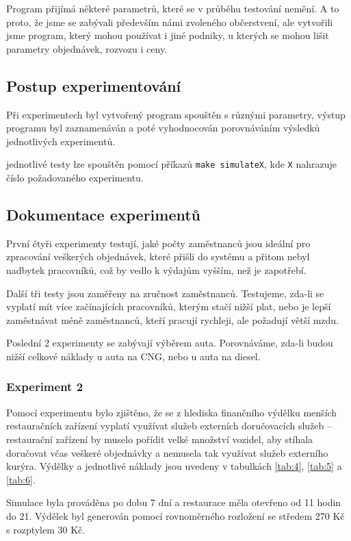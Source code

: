 \documentclass[a4paper, 11pt]{article}
\begin{document}
Program přijímá některé parametrů, které se v průběhu testování nemění. A to proto, že jsme se zabývali především námi zvoleného občerstvení, ale vytvořili jsme program, který mohou používat i jiné podniky, u kterých se mohou lišit parametry objednávek, rozvozu i ceny.

\subsection{Postup experimentování}
Při experimentech byl vytvořený program spouštěn s různými parametry, výstup programu byl zaznamenáván a poté vyhodnocován porovnáváním výsledků jednotlivých experimentů.


jednotlivé testy lze spouštěn pomocí příkazů \texttt{make simulateX}, kde \texttt{X} nahrazuje číslo požadovaného experimentu.

\subsection{Dokumentace experimentů}
První čtyři experimenty testují, jaké počty zaměstnanců jsou ideální pro zpracování veškerých objednávek, které přišli do systému a přitom nebyl nadbytek pracovníků, což by vedlo k výdajům vyšším, než je zapotřebí.

Další tři testy jsou zaměřeny na zručnost zaměstnanců. Testujeme, zda-li se vyplatí mít více začínajících pracovníků, kterým stačí nižší plat, nebo je lepší zaměstnávat méně zaměstnanců, kteří pracují rychleji, ale požadují větší mzdu.

Poslední 2 experimenty se zabývají výběrem auta. Porovnáváme, zda-li budou nižší celkové náklady u auta na CNG, nebo u auta na diesel. 

\subsubsection{Experiment 2}
Pomocí experimentu bylo zjištěno, že se z hlediska finančního výdělku menších restauračních zařízení vyplatí využívat služeb externích doručovacích služeb -- restaurační zařízení by muselo pořídit velké množství vozidel, aby stíhala doručovat včas veškeré objednávky a nemusela tak využívat služeb externího kurýra. Výdělky a jednotlivé náklady jsou uvedeny v tabulkách \ref{tab:4}, \ref{tab:5} a \ref{tab:6}. 

Simulace byla prováděna po dobu 7 dní a restaurace měla otevřeno od 11 hodin do 21. Výdělek byl generován pomocí rovnoměrného rozložení se středem 270 Kč s rozptylem 30 Kč. 
\end{document}
